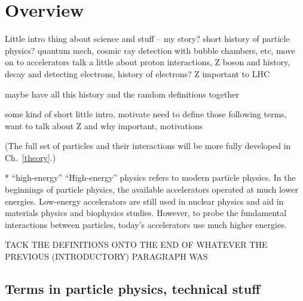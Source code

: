 \chapter{Overview}
\label{over}

Little intro thing about science and stuff -- my story?
short history of particle physics?
quantum mech, cosmic ray detection with bubble chambers, etc, 
move on to accelerators
talk a little about proton interactions, 
Z boson and history, decay and detecting electrons, history of electrons?
Z important to LHC

maybe have all this history and the random definitions together 

some kind of short little intro, motivate need to define those following terms,
want to talk about Z and why important, motivations

(The full set of particles and their interactions will be more fully 
developed in Ch.~\ref{theory}.)

   * ``high-energy''
``High-energy'' physics refers to modern particle physics. 
In the beginnings of particle physics, 
the available accelerators operated at much lower energies.  
Low-energy accelerators are still used in nuclear physics 
and aid in materials physics and biophysics studies. 
However, to probe the fundamental interactions between particles, 
today's accelerators use much higher energies.  

TACK THE DEFINITIONS ONTO THE END OF WHATEVER THE PREVIOUS 
(INTRODUCTORY) PARAGRAPH WAS

\section{Terms in particle physics, technical stuff}




